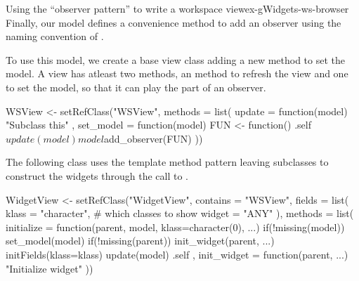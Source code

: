 \begin{example}{Using the ``observer pattern'' to write a workspace view}{ex-gWidgets-ws-browser}
Finally, our model defines a convenience method to add an observer
using the naming convention of .
\begin{Schunk}
\end{Schunk}


To use this model, we create a base view class adding a new method to
set the model. A view has atleast two methods, an 
method to refresh the view and one to set the model, so that it can
play the part of an observer. 
\begin{Schunk}
\begin{Sinput}
 WSView <- setRefClass("WSView",
                       methods = list(
                         update = function(model) {
                           "Subclass this"
                         },
                         set_model = function(model) {
                           FUN <- function() .self$update(model)
                           model$add_observer(FUN)
                         }
                         ))
\end{Sinput}
\end{Schunk}
%

The following  class uses the template method
pattern leaving subclasses to construct the widgets through the call
to . 

\begin{Schunk}
\begin{Sinput}
 WidgetView <- 
   setRefClass("WidgetView",
               contains = "WSView",
               fields = list(
                 klass = "character", # which classes to show
                 widget = "ANY"
                 ),
               methods = list(
                 initialize = function(parent, model, 
                     klass=character(0), ...) {
                   if(!missing(model)) set_model(model)
                   if(!missing(parent)) init_widget(parent, ...)
                   initFields(klass=klass)
                   update(model)
                   .self
                 },
                 init_widget = function(parent, ...) {
                   "Initialize widget"
                 }))
\end{Sinput}
\end{Schunk}
% 



\end{example}
